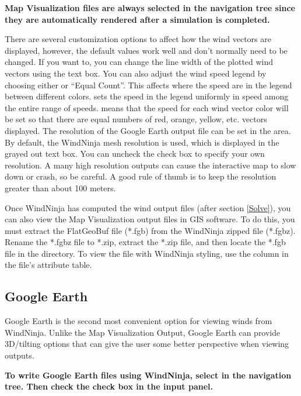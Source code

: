 \documentclass[12pt]{article}
\begin{document}
\textbf{\color{red} Map Visualization files are always selected in the navigation tree since they are automatically rendered after a simulation is completed.}

There are several customization options to affect how the wind vectors are displayed, however, the default values work well and don't normally need to be changed.  
If you want to, you can change the line width of the plotted wind vectors using the  text box.  
You can also adjust the wind speed legend by choosing either  or “Equal Count”.  
This affects where the speed  are in the legend between different colors.  
 sets the speed  in the legend uniformly in speed among the entire range of speeds.  
 means that the speed  for each wind vector color will be set so that there are equal numbers of red, orange, yellow, etc. vectors displayed.  
The resolution of the Google Earth output file can be set in the  area.  
By default, the WindNinja mesh resolution is used, which is displayed in the grayed out text box.  
You can uncheck the  check box to specify your own resolution.  
A many high resolution outputs can cause the interactive map to slow down or crash, so be careful.
A good rule of thumb is to keep the resolution greater than about 100 meters.

Once WindNinja has computed the wind output files (after section \ref{Solve}), you can also view the Map Visualization output files in GIS software. 
To do this, you must extract the FlatGeoBuf file (*.fgb) from the WindNinja zipped file (*.fgbz). 
Rename the *.fgbz file to *.zip, extract the *.zip file, and then locate the *.fgb file in the directory. 
To view the file with WindNinja styling, use the  column in the file's attribute table.  

\subsection{Google Earth}

Google Earth is the second most convenient option for viewing winds from WindNinja. 
Unlike the Map Visualization Output, Google Earth can provide 3D/tilting options that can give the user some better perspective when viewing outputs. 

\textbf{\color{red} To write Google Earth files using WindNinja, select  in the navigation tree.  
Then check the  check box in the input panel.}
\end{document}
